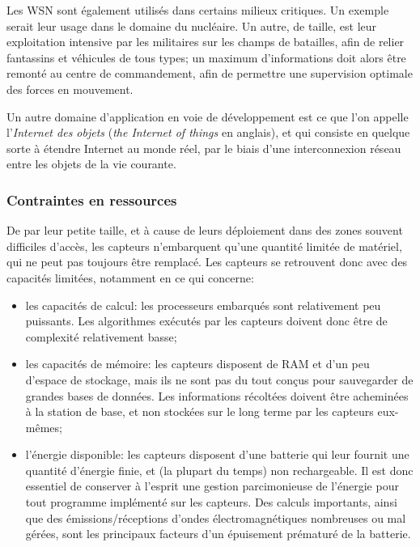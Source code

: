 Les WSN sont également utilisés dans certains milieux critiques.
Un exemple serait leur usage dans le domaine du nucléaire.
Un autre, de taille, est leur exploitation intensive par les militaires sur les champs de batailles, afin de relier fantassins et véhicules de tous types; un maximum d'informations doit alors être remonté au centre de commandement, afin de permettre une supervision optimale des forces en mouvement.

Un autre domaine d'application en voie de développement est ce que l'on appelle l'\textit{Internet des objets} (\textit{the Internet of things} en anglais), et qui consiste en quelque sorte à étendre Internet au monde réel, par le biais d'une interconnexion réseau entre les objets de la vie courante.

        \subsubsection{Contraintes en ressources}
De par leur petite taille, et à cause de leurs déploiement dans des zones souvent difficiles d'accès, les capteurs n'embarquent qu'une quantité limitée de matériel, qui ne peut pas toujours être remplacé.
Les capteurs se retrouvent donc avec des capacités limitées, notamment en ce qui concerne:
\begin{itemize}
    \item les capacités de calcul: les processeurs embarqués sont relativement peu puissants.
        Les algorithmes exécutés par les capteurs doivent donc être de complexité relativement basse;
    \item les capacités de mémoire: les capteurs disposent de RAM et d'un peu d'espace de stockage, mais ils ne sont pas du tout conçus pour sauvegarder de grandes bases de données.
        Les informations récoltées doivent être acheminées à la station de base, et non stockées sur le long terme par les capteurs eux-mêmes;
    \item l'énergie disponible: les capteurs disposent d'une batterie qui leur fournit une quantité d'énergie finie, et (la plupart du temps) non rechargeable.
        Il est donc essentiel de conserver à l'esprit une gestion parcimonieuse de l'énergie pour tout programme implémenté sur les capteurs.
        Des calculs importants, ainsi que des émissions/réceptions d'ondes électromagnétiques nombreuses ou mal gérées, sont les principaux facteurs d'un épuisement prématuré de la batterie. 
\end{itemize}

